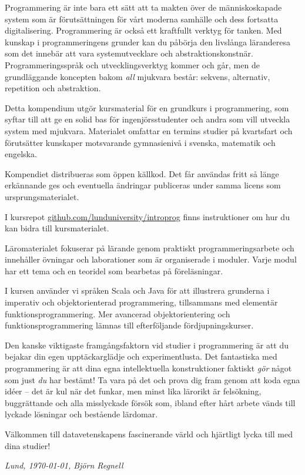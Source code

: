 


Programmering är inte bara ett sätt att ta makten över de människoskapade system som är förutsättningen för vårt moderna samhälle och dess fortsatta digitalisering. Programmering är också ett kraftfullt verktyg för tanken. Med kunskap i programmeringens grunder kan du påbörja den livslånga läranderesa som det innebär att vara systemutvecklare och abstraktionskonstnär. Programmeringsspråk och utvecklingsverktyg kommer och går, men de grundläggande koncepten bakom \emph{all} mjukvara består: sekvens, alternativ, repetition och abstraktion. 

Detta kompendium utgör kursmaterial för en grundkurs i programmering, som syftar till att ge en solid bas för ingenjörsstudenter och andra som vill utveckla system med mjukvara. Materialet omfattar en termins studier på kvartsfart och förutsätter kunskaper motsvarande gymnasienivå i svenska, matematik och engelska. 

Kompendiet distribueras som öppen källkod. Det får användas fritt så länge erkännande ges och eventuella ändringar publiceras under samma licens som ursprungsmaterialet. 

I kursrepot \href{http://github.com/lunduniversity/introprog}{github.com/lunduniversity/introprog} finns instruktioner om hur du kan bidra till kursmaterialet.

Läromaterialet fokuserar på lärande genom praktiskt programmeringsarbete och innehåller övningar och laborationer som är organiserade i moduler. Varje modul har ett tema och en teoridel som bearbetas på föreläsningar. 

I kursen använder vi språken Scala och Java för att illustrera grunderna i imperativ och objektorienterad programmering, tillsammans med elementär funktionsprogrammering. Mer avancerad objektorientering och funktionsprogrammering lämnas till efterföljande fördjupningskurser. 

Den kanske viktigaste framgångsfaktorn vid studier i programmering är att du bejakar din egen upptäckarglädje och experimentlusta. Det fantastiska med programmering är att dina egna intellektuella konstruktioner faktiskt \emph{gör} något som just \emph{du} har bestämt! Ta vara på det och prova dig fram genom att koda egna idéer -- det är kul när det funkar, men minst lika lärorikt är felsökning, buggrättande och alla misslyckade försök som, ibland efter hårt arbete vänds till lyckade lösningar och bestående lärdomar. 

Välkommen till datavetenskapens fascinerande värld och hjärtligt lycka till med dina studier!

\vspace{1em}\noindent \textit{\hfill Lund, \today, Björn Regnell}



